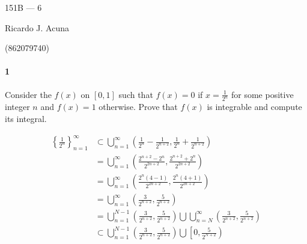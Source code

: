 \documentclass{article}
\begin{document}
\begin{center}
  151B --- 6

  Ricardo J. Acuna

  (862079740)
\end{center}\vspace{1.618em}

\paragraph{1} Consider the $f(x)$ on $[0, 1]$ such that $f(x) = 0$ if
$x = \frac{1}{2^n}$ for some positive integer $n$ and $f(x) = 1$ otherwise. Prove that $f(x)$ is integrable and compute its
integral.


\begin{align*}
\left\{\frac{1}{2^n}\right\}_{n=1}^\infty &\subset \bigcup_{n = 1}^\infty \left(\frac{1}{2^n}
                                            -\frac{1}{2^{n+2}},
                                            \frac{1}{2^n}+\frac{1}{2^{n+2}}\right)\\
                                           &=  \bigcup_{n = 1}^\infty
                                             \left(\frac{2^{n+2} -
                                             2^n}{2^{2n+2}},
                                             \frac{2^{n+2} +
                                             2^n}{2^{2n+2}}\right)\\
                                          &=  \bigcup_{n = 1}^\infty
                                             \left(\frac{2^{n}(4-1)
                                             }{2^{2n+2}},
                                             \frac{2^{n}(4+
                                            1)}{2^{2n+2}}\right)\\
                                          &=  \bigcup_{n = 1}^\infty
                                            \left(\frac{3
                                             }{2^{n+2}},
                                            \frac{5}{2^{n+2}}\right)\\
                                          &=  \bigcup_{n = 1}^{N-1}
                                            \left(\frac{3
                                             }{2^{n+2}},
                                            \frac{5}{2^{n+2}}\right)
                                            \bigcup \bigcup_{n = N}^\infty
                                            \left(\frac{3
                                             }{2^{n+2}},
                                            \frac{5}{2^{n+2}}\right)\\
                                          &\subset  \bigcup_{n = 1}^{N-1}
                                            \left(\frac{3
                                             }{2^{n+2}},
                                            \frac{5}{2^{n+2}}\right)
                                            \bigcup
                                            \left[  0,
                                            \frac{5}{2^{N+2}}\right)
\end{align*}
\end{document}
